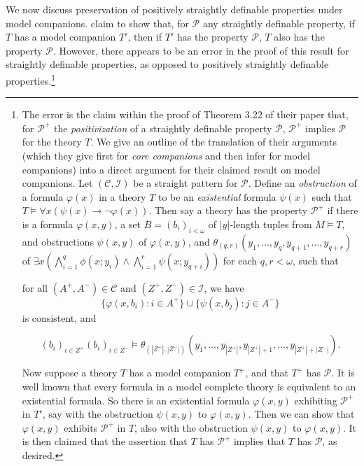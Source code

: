 \documentclass{article}
\newcommand{\calC}{\mathcal{C}}
\newcommand{\calI}{\mathcal{I}}
\newcommand{\vphi}{\varphi}
\theoremstyle{definition}
\theoremstyle{definition}
\theoremstyle{definition}
\begin{document}
We now discuss preservation of positively straightly definable properties under model companions. \cite{bodirsky2025taking} claim to show that, for $\mathcal{P}$ any straightly definable property, if $T$ has a model companion $T'$, then if $T'$ has the property $\mathcal{P}$, $T$ also has the property $\mathcal{P}$. However, there appears to be an error in the proof of this result for straightly definable properties, as opposed to positively straightly definable properties.\footnote{The error is the claim within the proof of Theorem 3.22 of their paper that, for $\mathcal{P}^{+}$ the \textit{positivization} of a straightly definable property $\mathcal{P}$,  $\mathcal{P}^{+}$ implies $\mathcal{P}$ for the theory $T$. We give an outline of the translation of their arguments (which they give first for \textit{core companions} and then infer for model companions) into a direct argument for their claimed result on model companions. Let $(\mathcal{C}, \mathcal{I})$ be a straight pattern for $\mathcal{P}$. Define an \textit{obstruction} of a formula $\varphi(x)$ in a theory $T$ to be an \textit{existential} formula $\psi(x)$ such that $T \models \forall x(\psi(x) \to \neg\varphi(x))$. Then say a theory has the property $\mathcal{P}^{+}$ if there is a formula $\varphi(x, y)$, a set $B=(b_i)_{i<\omega}$ of $|y|$-length tuples from $M\models T$, and obstructions $\psi(x, y)$ of $\varphi(x, y)$, and $\theta_{(q,r)}(y_1, \dots, y_q, y_{q+1}, \dots, y_{q+r})$ of $\exists x \left( \bigwedge_{i=1}^q \phi(x; y_i) \wedge \bigwedge_{i=1}^r \psi(x; y_{q+i}) \right)$ for each $q, r < \omega$, such that


for all $(A^+,A^-)\in \calC$ and $(Z^+,Z^-)\in \calI$, we have 
    \[\{\vphi(x,b_i)\colon i\in A^+\}\cup \{\psi(x,b_j)\colon j\in A^-\}\] is consistent, and


    $$(b_{i})_{i \in Z^{+}}(b_{i})_{i \in Z^{-}} \models \theta_{(|Z^{+}|, |Z^{-}|)}(y_1, \dots, y_{|Z^{+}|}, y_{|Z^{+}|+1}, \dots, y_{|Z^{+}|+|Z^{-}|}).$$


    Now suppose a theory $T$ has a model companion $T^{+}$, and that $T^{+}$ has $\mathcal{P}$. It is well known that every formula in a model complete theory is equivalent to an existential formula. So there is an existential formula $\varphi(x, y)$ exhibiting $\mathcal{P}^{+}$ in $T'$, say with the obstruction $\psi(x, y)$ to $\varphi(x, y)$. Then we can show that $\varphi(x, y)$ exhibits $\mathcal{P}^{+}$ in $T$, also with the obstruction $\psi(x, y)$ to $\varphi(x, y)$. It is then claimed that the assertion that $T$ has $\mathcal{P}^{+}$ implies that $T$ has $\mathcal{P}$, as desired.

}
\end{document}
